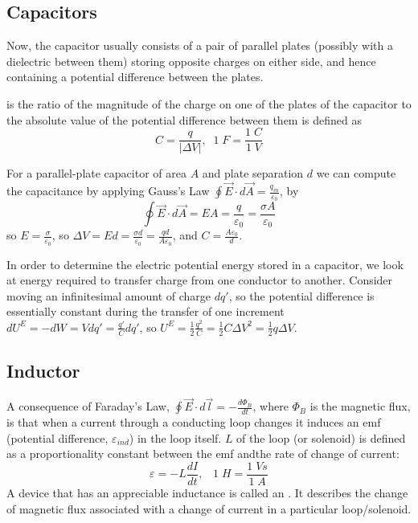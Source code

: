 \subsection{Capacitors}

Now, the capacitor usually consists of a pair of parallel plates (possibly with a dielectric between them) storing opposite charges on either side, and hence containing a potential difference between the plates.

\begin{defn}
     is the ratio of the magnitude of the charge on one of the plates of the capacitor to the absolute value of the potential difference between them is defined as \begin{equation*}
        C = \frac{q}{|\Delta V|},\;\;1\;F = \frac{1\;C}{1\;V}
    \end{equation*}
\end{defn}
For a parallel-plate capacitor of area $A$ and plate separation $d$ we can compute the capacitance by applying Gauss's Law $\oint\vec{E}\cdot d\vec{A} = \frac{q_{in}}{\varepsilon_0}$, by $$\oint\vec{E}\cdot d\vec{A} = EA = \frac{q}{\varepsilon_0} = \frac{\sigma A}{\varepsilon_0}$$ so $E = \frac{\sigma}{\varepsilon_0}$, so $\Delta V = Ed = \frac{\sigma d}{\varepsilon_0} = \frac{qd}{A\varepsilon_0}$, and $C = \frac{A\varepsilon_0}{d}$.

In order to determine the electric potential energy stored in a capacitor, we look at energy required to transfer charge from one conductor to another. Consider moving an infinitesimal amount of charge $dq'$, so the potential difference is essentially constant during the transfer of one increment $dU^E = -dW = Vdq' = \frac{q'}{C}dq'$, so $U^E = \frac{1}{2}\frac{q^2}{C} = \frac{1}{2}C\Delta V^2 = \frac{1}{2}q\Delta V$.

\subsection{Inductor}

A consequence of Faraday's Law, $\oint \vec{E}\cdot d\vec{l} = -\frac{d\Phi_B}{dt}$, where $\Phi_B$ is the magnetic flux, is that when a current through a conducting loop changes it induces an emf (potential difference, $\varepsilon_{ind}$) in the loop itself.  $L$ of the loop (or solenoid) is defined as a proportionality constant between the emf andthe rate of change of current: $$\varepsilon = -L\frac{dI}{dt},\;\;\;1\;H = \frac{1\;Vs}{1\;A}$$
A device that has an appreciable inductance is called an . It describes the change of magnetic flux associated with a change of current in a particular loop/solenoid.

